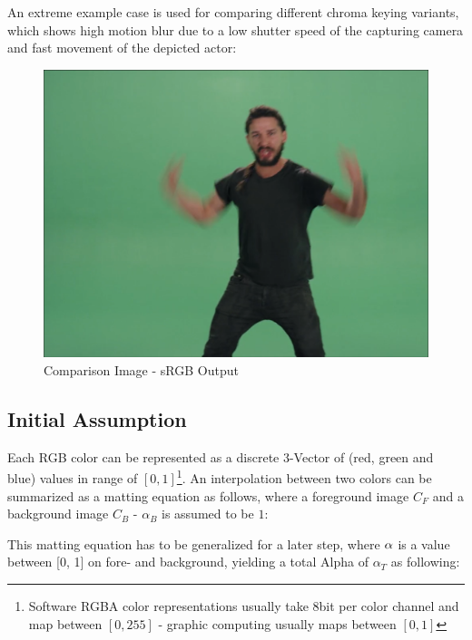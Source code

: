 An extreme example case is used for comparing different chroma keying variants, 
which shows high motion blur due to a low shutter speed of the capturing 
camera and fast movement of the depicted actor:

\begin{figure}[htb]
	\includegraphics[width=\textwidth]{_raw_resources/Comparison_Example.png}
	\caption{Comparison Image \cite{vimeo:shia:2015} - sRGB Output}
	\label{fig:chroma:color}
\end{figure}

\subsection{Initial Assumption}

Each RGB color can be represented as a discrete 3-Vector of (red, green and 
blue)  values in range of $[0, 1]$\footnote{Software RGBA color representations 
usually take 8bit per color channel and map between $[0, 255]$ - graphic 
computing usually maps between $[0, 1]$}. An interpolation between two colors 
can be summarized as a matting equation as follows, where a foreground image 
$C_F$ and a background image $C_B$ - $\alpha_B$ is assumed to be $1$:


This matting equation has to be generalized for a later step, where 
$\protect\alpha$ is a value between [0, 1] on fore- and background, yielding a 
total Alpha of $\alpha_T$ as following:

